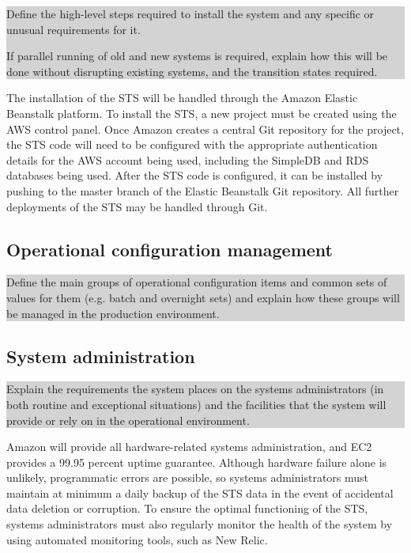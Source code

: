 \documentclass[a4paper,11pt]{report}
\newcommand{\instructions}[1]{
  \noindent\colorbox{lightgray}{%
    \parbox{\linewidth}{%
      #1
    }%
  }%
 \vspace{0.1cm}
}
\begin{document}
\instructions{
Define the high-level steps required to install the system and any
specific or unusual requirements for it.

If parallel running of old and new systems is required, explain how
this will be done without disrupting existing systems, and the
transition states required.
}

The installation of the STS will be handled through the Amazon Elastic Beanstalk
platform. To install the STS, a new project must be created using the AWS
control panel. Once Amazon creates a central Git repository for the project, the
STS code will need to be configured with the appropriate authentication details
for the AWS account being used, including the SimpleDB and RDS databases being
used. After the STS code is configured, it can be installed by pushing to the
master branch of the Elastic Beanstalk Git repository. All further deployments
of the STS may be handled through Git.

\subsection{Operational configuration management}
\label{sec:oper-conf-manag}

\instructions{
Define the main groups of operational configuration items and common
sets of values for them (e.g. batch and overnight sets) and explain
how these groups will be managed in the production environment.
}

\subsection{System administration}
\label{sec:syst-admin}

\instructions{
Explain the requirements the system places on the systems
administrators (in both routine and exceptional situations) and the
facilities that the system will provide or rely on in the operational
environment.
}

Amazon will provide all hardware-related systems administration, and EC2 
provides a 99.95 percent uptime guarantee. Although hardware failure alone is
unlikely, programmatic errors are possible, so systems administrators must
maintain at minimum a daily backup of the STS data in the event of accidental
data deletion or corruption. To ensure the optimal functioning of the STS,
systems administrators must also regularly monitor the health of the system by
using automated monitoring tools, such as New Relic.
\end{document}

